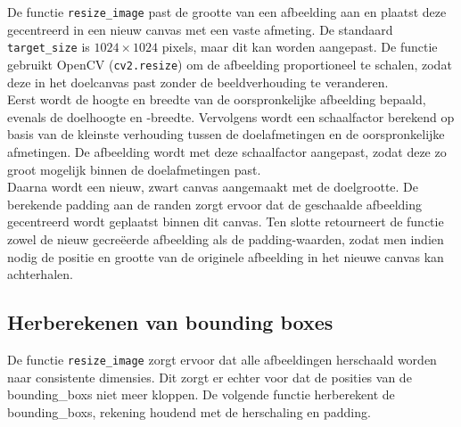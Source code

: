 De functie \texttt{resize\_image} past de grootte van een afbeelding aan en plaatst deze gecentreerd in een nieuw canvas met een vaste afmeting. De standaard \texttt{target\_size} is $1024 \times 1024$ pixels, maar dit kan worden aangepast. De functie gebruikt OpenCV (\texttt{cv2.resize}) om de afbeelding proportioneel te schalen, zodat deze in het doelcanvas past zonder de beeldverhouding te veranderen. \\

Eerst wordt de hoogte en breedte van de oorspronkelijke afbeelding bepaald, evenals de doelhoogte en -breedte. Vervolgens wordt een schaalfactor berekend op basis van de kleinste verhouding tussen de doelafmetingen en de oorspronkelijke afmetingen. De afbeelding wordt met deze schaalfactor aangepast, zodat deze zo groot mogelijk binnen de doelafmetingen past. \\

Daarna wordt een nieuw, zwart canvas aangemaakt met de doelgrootte. De berekende padding aan de randen zorgt ervoor dat de geschaalde afbeelding gecentreerd wordt geplaatst binnen dit canvas. Ten slotte retourneert de functie zowel de nieuw gecreëerde afbeelding als de padding-waarden, zodat men indien nodig de positie en grootte van de originele afbeelding in het nieuwe canvas kan achterhalen.


\subsection{Herberekenen van bounding boxes}

De functie \texttt{resize\_image} zorgt ervoor dat alle afbeeldingen herschaald worden naar consistente dimensies. Dit zorgt er echter voor dat de posities van de \glspl{bounding_box} niet meer kloppen. De volgende functie herberekent de \glspl{bounding_box}, rekening houdend met de herschaling en padding.

